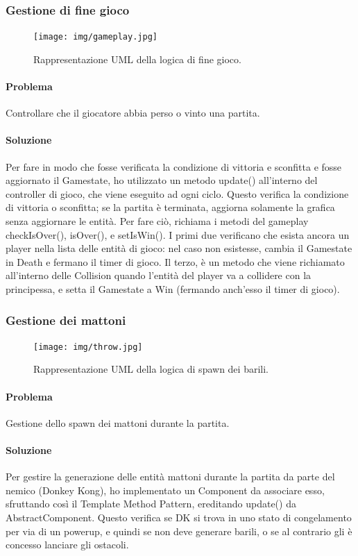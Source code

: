 \subsubsection{Gestione di fine gioco}

\begin{figure}[H]
\centering{}
\texttt{[image: img/gameplay.jpg]}
\caption{Rappresentazione UML della logica di fine gioco.}
\end{figure}

\paragraph{Problema} Controllare che il giocatore abbia perso o vinto una partita.

\paragraph{Soluzione} Per fare in modo che fosse verificata la condizione di vittoria e sconfitta e fosse aggiornato il Gamestate, ho utilizzato un metodo update() all’interno del controller di gioco, che viene eseguito ad ogni ciclo. Questo verifica la condizione di vittoria o sconfitta; se la partita è terminata, aggiorna solamente la grafica senza aggiornare le entità. Per fare ciò, richiama i metodi del gameplay checkIsOver(), isOver(), e setIsWin(). I primi due verificano che esista ancora un player nella lista delle entità di gioco: nel caso non esistesse, cambia il Gamestate in Death e fermano il timer di gioco. Il terzo, è un metodo che viene richiamato all’interno delle Collision quando l’entità del player va a collidere con la principessa, e setta il Gamestate a Win (fermando anch’esso il timer di gioco).

\subsubsection{Gestione dei mattoni}

\begin{figure}[H]
\centering{}
\texttt{[image: img/throw.jpg]}
\caption{Rappresentazione UML della logica di spawn dei barili.}
\end{figure}

\paragraph{Problema} Gestione dello spawn dei mattoni durante la partita.

\paragraph{Soluzione} Per gestire la generazione delle entità mattoni durante la partita da parte del nemico (Donkey Kong), ho implementato un Component da associare esso, sfruttando così il Template Method Pattern, ereditando update() da AbstractComponent. Questo verifica se DK si trova in uno stato di congelamento per via di un powerup, e quindi se non deve generare barili, o se al contrario gli è concesso lanciare gli ostacoli.

